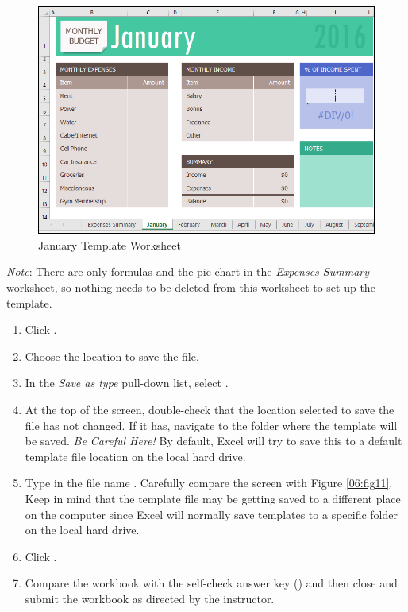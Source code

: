 \begin{figure}[H]
	\centering
	\includegraphics[width=\maxwidth{.95\linewidth}]{gfx/ch06_fig10}
	\caption{January Template Worksheet}
	\label{06:fig10}
\end{figure}

\textit{Note}: There are only formulas and the pie chart in the \textit{Expenses Summary} worksheet, so nothing needs to be deleted from this worksheet to set up the template.

\begin{enumbox}
	\begin{enumerate}
		\item Click .
		\item Choose the location to save the file.
		\item In the \textit{Save as type} pull-down list, select .
		\item At the top of the screen, double-check that the location selected to save the file has not changed. If it has, navigate to the folder where the template will be saved. \textit{Be Careful Here!} By default, Excel will try to save this to a default template file location on the local hard drive.
		\item Type in the file name . Carefully compare the screen with Figure \ref{06:fig11}. Keep in mind that the template file may be getting saved to a different place on the computer since Excel will normally save templates to a specific folder on the local hard drive.
		\item Click .
		\item Compare the workbook with the self-check answer key () and then close and submit the  workbook as directed by the instructor.
	\end{enumerate}
\end{enumbox}
	
